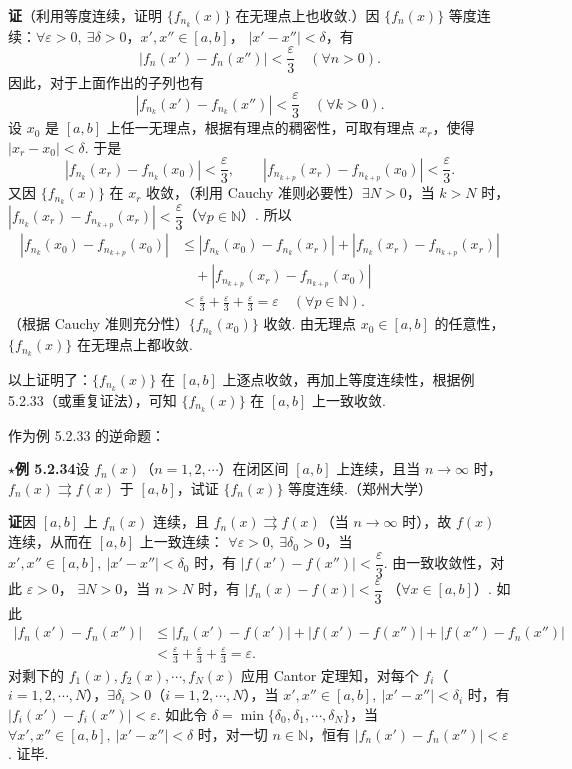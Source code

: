 \documentclass[UTF8,12pt,a4paper,fontset=fandol]{ctexart}
\begin{document}
\noindent\textbf{证}\quad （利用等度连续，证明 $\{f_{n_k}(x)\}$ 在无理点上也收敛.）因
$\{f_n(x)\}$ 等度连续：$\forall\varepsilon>0,\ \exists\delta>0$，$x',x''\in[a,b]$，
$|x'-x''|<\delta$，有
\[
  |f_n(x')-f_n(x'')|<\frac\varepsilon3\quad(\forall n>0).
\]
因此，对于上面作出的子列也有
\[
  |f_{n_k}(x')-f_{n_k}(x'')|<\frac\varepsilon3\quad(\forall k>0).
\]
设 $x_0$ 是 $[a,b]$ 上任一无理点，根据有理点的稠密性，可取有理点 $x_r$，使得
$|x_r-x_0|<\delta$. 于是
\[
  |f_{n_k}(x_r)-f_{n_k}(x_0)|<\frac\varepsilon3,\qquad
  |f_{n_{k+p}}(x_r)-f_{n_{k+p}}(x_0)|<\frac\varepsilon3.
\]
又因 $\{f_{n_k}(x)\}$ 在 $x_r$ 收敛，（利用 Cauchy 准则必要性）$\exists N>0$，当
$k>N$ 时，$|f_{n_k}(x_r)-f_{n_{k+p}}(x_r)|<\dfrac\varepsilon3$（$\forall p\in\mathbb N$）. 所以
\[
\begin{aligned}
  |f_{n_k}(x_0)-f_{n_{k+p}}(x_0)|
  &\le |f_{n_k}(x_0)-f_{n_k}(x_r)|
    +|f_{n_k}(x_r)-f_{n_{k+p}}(x_r)|\\
  &\quad +|f_{n_{k+p}}(x_r)-f_{n_{k+p}}(x_0)|\\
  &<\frac\varepsilon3+\frac\varepsilon3+\frac\varepsilon3=\varepsilon\quad(\forall p\in\mathbb N).
\end{aligned}
\]
（根据 Cauchy 准则充分性）$\{f_{n_k}(x_0)\}$ 收敛. 由无理点 $x_0\in[a,b]$ 的任意性，
$\{f_{n_k}(x)\}$ 在无理点上都收敛.

以上证明了：$\{f_{n_k}(x)\}$ 在 $[a,b]$ 上逐点收敛，再加上等度连续性，根据例 5.2.33（或重复证法），可知
$\{f_{n_k}(x)\}$ 在 $[a,b]$ 上一致收敛.

作为例 5.2.33 的逆命题：

\noindent\textbf{$\star$例 5.2.34}\quad 设 $f_n(x)$（$n=1,2,\cdots$）在闭区间 $[a,b]$ 上连续，且当
$n\to\infty$ 时，$f_n(x)\rightrightarrows f(x)$ 于 $[a,b]$，试证 $\{f_n(x)\}$ 等度连续.（郑州大学）

\noindent\textbf{证}\quad 因 $[a,b]$ 上 $f_n(x)$ 连续，且 $f_n(x)\rightrightarrows f(x)$（当
$n\to\infty$ 时），故 $f(x)$ 连续，从而在 $[a,b]$ 上一致连续：
$\forall\varepsilon>0,\ \exists\delta_0>0$，当
$x',x''\in[a,b],\ |x'-x''|<\delta_0$ 时，有
$|f(x')-f(x'')|<\dfrac\varepsilon3$. 由一致收敛性，对此 $\varepsilon>0$，
$\exists N>0$，当 $n>N$ 时，有 $|f_n(x)-f(x)|<\dfrac\varepsilon3$
（$\forall x\in[a,b]$）. 如此
\[
\begin{aligned}
  |f_n(x')-f_n(x'')|
  &\le |f_n(x')-f(x')|+|f(x')-f(x'')|+|f(x'')-f_n(x'')|\\
  &<\frac\varepsilon3+\frac\varepsilon3+\frac\varepsilon3=\varepsilon.
\end{aligned}
\]
对剩下的 $f_1(x),f_2(x),\cdots,f_N(x)$ 应用 Cantor 定理知，对每个
$f_i$（$i=1,2,\cdots,N$），$\exists\delta_i>0$（$i=1,2,\cdots,N$），当
$x',x''\in[a,b],\ |x'-x''|<\delta_i$ 时，有 $|f_i(x')-f_i(x'')|<\varepsilon$. 如此令
$\delta=\min\{\delta_0,\delta_1,\cdots,\delta_N\}$，当
$\forall x',x''\in[a,b],\ |x'-x''|<\delta$ 时，对一切 $n\in\mathbb N$，恒有
$|f_n(x')-f_n(x'')|<\varepsilon$. 证毕.
\end{document}
